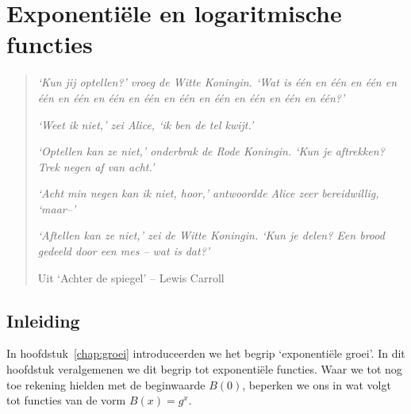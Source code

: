 %                   
%                 
%                       
%    
%     


\chapter{Exponenti\"{e}le en logaritmische functies}
\label{chap:expFunctie}


\begin{quote}
     \textit{ `Kun jij optellen?' vroeg de Witte Koningin.
     `Wat is \'{e}\'{e}n en \'{e}\'{e}n en \'{e}\'{e}n en \'{e}\'{e}n
     en \'{e}\'{e}n en \'{e}\'{e}n en \'{e}\'{e}n en \'{e}\'{e}n en
     \'{e}\'{e}n en \'{e}\'{e}n en \'{e}\'{e}n en \'{e}\'{e}n?'}

     \textit{`Weet ik niet,' zei Alice, `ik ben de tel kwijt.'}

     \textit{`Optellen kan ze niet,' onderbrak de Rode Koningin. `Kun je
          aftrekken? Trek negen af van acht.'}

     \textit{`Acht min negen kan ik niet, hoor,' antwoordde Alice zeer
          bereidwillig, `maar--'}

     \textit{`Aftellen kan ze niet,' zei de Witte Koningin. `Kun je delen? Een
          brood gedeeld door een mes -- wat is \emph{dat}?'}

          Uit `Achter de spiegel' -- Lewis Carroll
\end{quote}


\newpage
\section{Inleiding}
In hoofdstuk~\ref{chap:groei} introduceerden we het begrip `exponentiële groei'. In dit hoofdstuk veralgemenen we dit begrip tot exponentiële functies. Waar we tot nog toe rekening hielden met de beginwaarde $B(0)$, beperken we ons in wat volgt tot functies van de vorm $B(x)=g^x$. 


